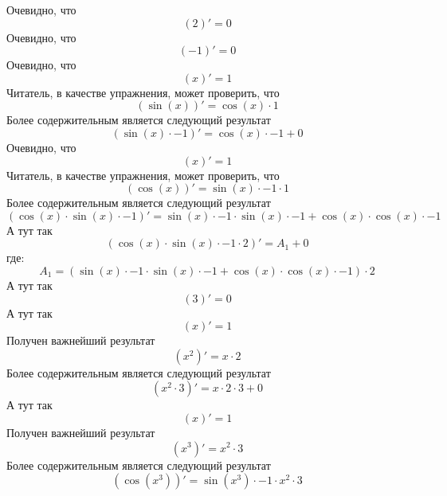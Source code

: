 \documentclass{article}
\begin{document}
Очевидно, что\newline
\[( 2 )' =  0 \]\newline
Очевидно, что\newline
\[( -1 )' =  0 \]\newline
Очевидно, что\newline
\[( x)' =  1 \]\newline
Читатель, в качестве упражнения, может проверить, что\newline
\[(\sin( x))' = \cos( x)\cdot 1 \]\newline
Более содержительным является следующий результат\newline
\[(\sin( x)\cdot -1 )' = \cos( x)\cdot -1 + 0 \]\newline
Очевидно, что\newline
\[( x)' =  1 \]\newline
Читатель, в качестве упражнения, может проверить, что\newline
\[(\cos( x))' = \sin( x)\cdot -1 \cdot 1 \]\newline
Более содержительным является следующий результат\newline
\[(\cos( x)\cdot\sin( x)\cdot -1 )' = \sin( x)\cdot -1 \cdot\sin( x)\cdot -1 +\cos( x)\cdot\cos( x)\cdot -1 \]\newline
А тут так\newline
\[(\cos( x)\cdot\sin( x)\cdot -1 \cdot 2 )' =  A_{1} + 0 \]\newline
где:\[A_{1} = (\sin( x)\cdot -1 \cdot\sin( x)\cdot -1 +\cos( x)\cdot\cos( x)\cdot -1 )\cdot 2 \]
А тут так\newline
\[( 3 )' =  0 \]\newline
А тут так\newline
\[( x)' =  1 \]\newline
Получен важнейший результат\newline
\[( x^{ 2 })' =  x\cdot 2 \]\newline
Более содержительным является следующий результат\newline
\[( x^{ 2 }\cdot 3 )' =  x\cdot 2 \cdot 3 + 0 \]\newline
А тут так\newline
\[( x)' =  1 \]\newline
Получен важнейший результат\newline
\[( x^{ 3 })' =  x^{ 2 }\cdot 3 \]\newline
Более содержительным является следующий результат\newline
\[(\cos( x^{ 3 }))' = \sin( x^{ 3 })\cdot -1 \cdot x^{ 2 }\cdot 3 \]\newline
\end{document}

